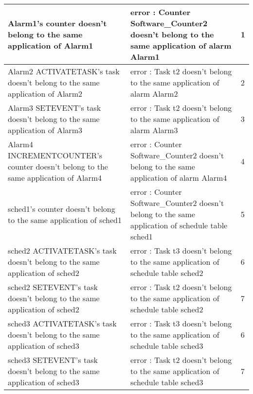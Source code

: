 \documentclass[10pt]{article}
\newlength{\Li}\settowidth{\Li}{Running}
\newlength{\Lii}\setlength{\Lii}{7cm}
\newlength{\Liiii}\setlength{\Liiii}{0.9cm}
\newlength{\Liii}\setlength{\Liii}{\textwidth} \addtolength{\Liii}{-\Li} \addtolength{\Liii}{-\Lii} \addtolength{\Liii}{-\Liiii}
\begin{document}
	\begin{supertabular}{|p{\Li}|p{\Lii}|p{\Liii}|} \hline 
	Alarm1's counter doesn't belong to the same application of Alarm1			& error : Counter Software\_Counter2 doesn't belong to the same application of alarm Alarm1	 	& 1 \\ \hline
	Alarm2 ACTIVATETASK's task doesn't belong to the same application of Alarm2 & error : Task t2 doesn't belong to the same application of alarm Alarm2	 					& 2 \\ \hline
	Alarm3 SETEVENT's task doesn't belong to the same application of Alarm3	& error : Task t2 doesn't belong to the same application of alarm Alarm3	 					& 3 \\ \hline
	Alarm4 INCREMENTCOUNTER's counter doesn't belong to the same application of Alarm4 & error : Counter Software\_Counter2 doesn't belong to the same application of alarm Alarm4	& 4 \\ \hline
	sched1's counter doesn't belong to the same application of sched1			& error : Counter Software\_Counter2 doesn't belong to the same application of schedule table sched1 	& 5 \\ \hline
	sched2 ACTIVATETASK's task doesn't belong to the same application of sched2 	& error : Task t3 doesn't belong to the same application of schedule table sched2				& 6 \\ \hline
	sched2 SETEVENT's task doesn't belong to the same application of sched2	& error : Task t2 doesn't belong to the same application of schedule table sched2					& 7 \\ \hline
	sched3 ACTIVATETASK's task doesn't belong to the same application of sched3	& error : Task t3 doesn't belong to the same application of schedule table sched3				& 6 \\ \hline
	sched3 SETEVENT's task doesn't belong to the same application of sched3	& error : Task t2 doesn't belong to the same application of schedule table sched3					& 7 \\ \hline
	\end{supertabular}\\

	
\theendnotes
	
 
 
\end{document}

